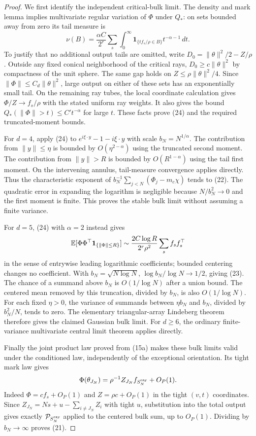 \begin{proof}
We first identify the independent critical-bulk limit. The density and
mark lemma implies multivariate regular variation of $\Phi$ under $Q_*$:
on sets bounded away from zero its tail measure is
\[
 \nu(B)=\frac{\alpha C}{2^r}\sum_s\int_0^\infty
                    \mathbf1_{\{tf_s/\rho\in B\}}
                                      t^{-\alpha-1}\,dt. \tag{24}
\]
To justify that no additional output tails are omitted, write
$D_0=\|\theta\|^2/2-Z/\rho$. Outside any fixed conical neighborhood
of the critical rays, $D_0\ge c\|\theta\|^2$ by compactness of the
unit sphere. The same gap holds on
$Z\le\rho\|\theta\|^2/4$. Since $\|\Phi\|\le C_d\|\theta\|^2$,
large output on either of these sets has an exponentially small tail.
On the remaining ray tubes, the local coordinate calculation gives
$\Phi/Z\to f_s/\rho$ with the stated uniform ray weights. It also
gives the bound $Q_*(\|\Phi\|>t)\le C't^{-\alpha}$ for large $t$.
These facts prove (24) and the required truncated-moment bounds.

For $d=4$, apply (24) to
$e^{i\xi\cdot y}-1-i\xi\cdot y$ with scale $b_N=N^{1/\alpha}$.
The contribution from $\|y\|\le\eta$ is bounded by $O(\eta^{2-\alpha})$
using the truncated second moment. The contribution from
$\|y\|>R$ is bounded by $O(R^{1-\alpha})$ using the tail first moment.
On the intervening annulus, tail-measure convergence applies directly.
Thus the characteristic exponent of
$b_N^{-1}\sum_{j<N}(\Phi_j-m_c\chi)$ tends to (22).
The quadratic error in expanding the logarithm is negligible because
$N/b_N^2\to0$ and the first moment is finite. This proves the stable
bulk limit without assuming a finite variance.

For $d=5$, (24) with $\alpha=2$ instead gives
\[
 \mathbb E[\Phi\Phi^\top\mathbf1_{\{\|\Phi\|\le R\}}]
       \sim \frac{2C\log R}{2^r\rho^2}\sum_s f_sf_s^\top
\]
in the sense of entrywise leading logarithmic coefficients; bounded
centering changes no coefficient. With $b_N=\sqrt{N\log N}$,
$\log b_N/\log N\to1/2$, giving (23).
The chance of a summand above $b_N$ is $O(1/\log N)$ after a union
bound. The centered mean removed by this truncation, divided by $b_N$,
is also $O(1/\log N)$. For each fixed $\eta>0$, the variance of
summands between $\eta b_N$ and $b_N$, divided by $b_N^2/N$, tends
to zero. The elementary triangular-array Lindeberg theorem therefore
gives the claimed Gaussian bulk limit. For $d\ge6$, the ordinary
finite-variance multivariate central limit theorem applies directly.

Finally the joint product law proved from (15a) makes these bulk limits
valid under the conditioned law, independently of the exceptional
orientation. Its tight mark law gives
\[
 \Phi(\theta_{J_N})=\rho^{-1}Z_{J_N}f_{S_N^{\rm ray}}+O_P(1).
\]
Indeed $\Phi=c f_s+O_P(1)$ and $Z=\rho c+O_P(1)$ in the tight
$(v,t)$ coordinates. Since
$Z_{J_N}=Ns+u-\sum_{i\ne J_N}Z_i$ with tight $u$, substitution
into the total output gives exactly $\mathcal P_{S_N^{\rm ray}}$
applied to the centered bulk sum, up to $O_P(1)$.
Dividing by $b_N\to\infty$ proves (21).
\end{proof}

